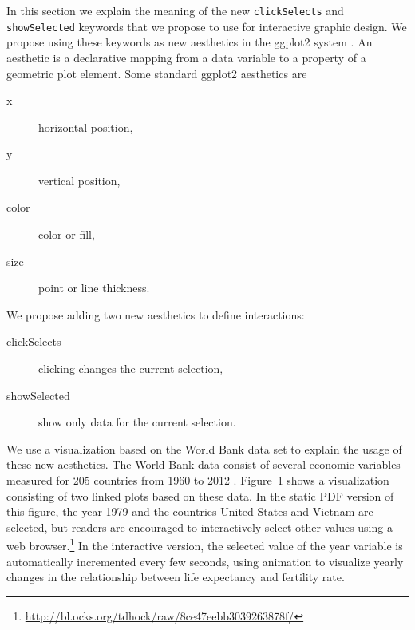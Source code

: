 \documentclass[journal]{vgtc}\usepackage[]{graphicx}\usepackage[]{color}
\begin{document}






In this section we explain the meaning of the new
\texttt{clickSelects} and \texttt{showSelected} keywords that we
propose to use for interactive graphic design. We
propose using these keywords as new aesthetics in the ggplot2 system
\citep{ggplot2-book}. An aesthetic is a declarative mapping from a
data variable to a property of a geometric plot element. Some standard
ggplot2 aesthetics are
\begin{description}
\item[x] horizontal position,
\item[y] vertical position,
\item[color] color or fill,
\item[size] point or line thickness.
\end{description}
We propose adding two new aesthetics to define interactions:
\begin{description}
\item[clickSelects] clicking changes the current selection,
\item[showSelected] show only data for the current selection.
\end{description}

We use a visualization based on the World Bank data set to explain
the usage of these new aesthetics. The World Bank data consist of
several economic variables measured for 205 countries from 1960 to
2012 \citep{WorldBank}. Figure~1 shows a visualization consisting of
two linked plots based on these data. In the static PDF version of
this figure, the year 1979 and the countries United States and Vietnam
are selected, but readers are encouraged to interactively select other
values using a web
browser.\footnote{\url{http://bl.ocks.org/tdhock/raw/8ce47eebb3039263878f/}}
In the interactive version, the selected value of the year variable is
automatically incremented every few seconds, using animation to
visualize yearly changes in the relationship between life expectancy
and fertility rate.
\end{document}
